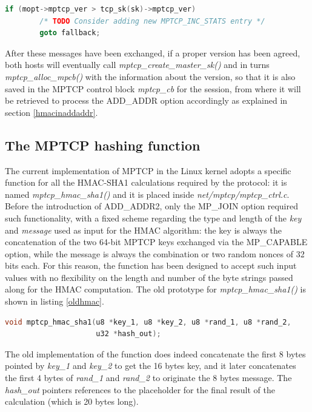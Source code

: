 \begin{lstlisting}[language=c, caption=\textit{MPTCP version agreement, phase 3}, label=verphase3]
	if (mopt->mptcp_ver > tcp_sk(sk)->mptcp_ver)
		/* TODO Consider adding new MPTCP_INC_STATS entry */
		goto fallback;
\end{lstlisting}

After these messages have been exchanged, if a proper version has been agreed, both hosts will eventually call \textit{mptcp\_create\_master\_sk()} and in turns \textit{mptcp\_alloc\_mpcb()} with the information about the version, so that it is also saved in the MPTCP control block \textit{mptcp\_cb} for the session, from where it will be retrieved to process the ADD\_ADDR option accordingly as explained in section \ref{hmacinaddaddr}.


\subsection{The MPTCP hashing function}
\label{newhash}
The current implementation of MPTCP in the Linux kernel adopts a specific function for all the HMAC-SHA1 calculations required by the protocol: it is named \textit{mptcp\_hmac\_sha1()} and it is placed inside \textit{net/mptcp/mptcp\_ctrl.c}. Before the introduction of ADD\_ADDR2, only the MP\_JOIN option required such functionality, with a fixed scheme regarding the type and length of the \textit{key} and \textit{message} used as input for the HMAC algorithm: the key is always the concatenation of the two 64-bit MPTCP keys exchanged via the MP\_CAPABLE option, while the message is always the combination or two random nonces of 32 bits each. For this reason, the function has been designed to accept such input values with no flexibility on the length and number of the byte strings passed along for the HMAC computation. The old prototype for \textit{mptcp\_hmac\_sha1()} is shown in listing \ref{oldhmac}.

\begin{lstlisting}[language=c, caption=\textit{Prototype for the old \textit{mptcp\_hmac\_sha1() function}}, label=oldhmac]
void mptcp_hmac_sha1(u8 *key_1, u8 *key_2, u8 *rand_1, u8 *rand_2, 
                     u32 *hash_out);
\end{lstlisting}
 
The old implementation of the function does indeed concatenate the first 8 bytes pointed by \textit{key\_1} and \textit{key\_2} to get the 16 bytes key, and it later concatenates the first 4 bytes of \textit{rand\_1} and \textit{rand\_2} to originate the 8 bytes message. The \textit{hash\_out} pointers references to the placeholder for the final result of the calculation (which is 20 bytes long).


